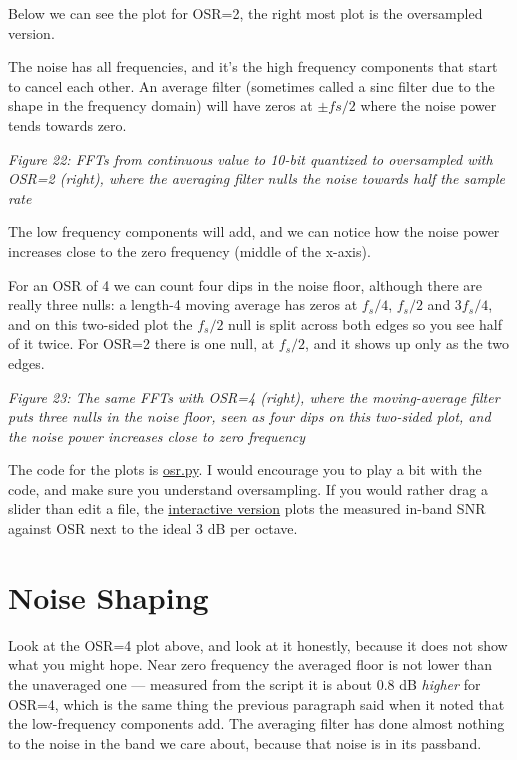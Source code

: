 Below we can see the plot for OSR=2, the right most plot is the
oversampled version.

The noise has all frequencies, and it's the high frequency components
that start to cancel each other. An average filter (sometimes called a
sinc filter due to the shape in the frequency domain) will have zeros at
\(\pm fs/2\) where the noise power tends towards zero.


{
\centering
{}
}

\emph{Figure 22: FFTs from continuous value to 10-bit quantized to
oversampled with OSR=2 (right), where the averaging filter nulls the
noise towards half the sample rate}

The low frequency components will add, and we can notice how the noise
power increases close to the zero frequency (middle of the x-axis).

For an OSR of 4 we can count four dips in the noise floor, although
there are really three nulls: a length-4 moving average has zeros at
\(f_s/4\), \(f_s/2\) and \(3f_s/4\), and on this two-sided plot the
\(f_s/2\) null is split across both edges so you see half of it twice.
For OSR=2 there is one null, at \(f_s/2\), and it shows up only as the
two edges.


{
\centering
{}
}

\emph{Figure 23: The same FFTs with OSR=4 (right), where the
moving-average filter puts three nulls in the noise floor, seen as four
dips on this two-sided plot, and the noise power increases close to zero
frequency}

The code for the plots is
\href{https://github.com/wulffern/aic2026/blob/main/ex/osr.py}{osr.py}.
I would encourage you to play a bit with the code, and make sure you
understand oversampling. If you would rather drag a slider than edit a
file, the
\href{https://wulffern.github.io/aic2026/assets/examples/oversampling.html}{interactive
version} plots the measured in-band SNR against OSR next to the ideal 3
dB per octave.

\section{Noise Shaping}\label{noise-shaping}

Look at the OSR=4 plot above, and look at it honestly, because it does
not show what you might hope. Near zero frequency the averaged floor is
not lower than the unaveraged one --- measured from the script it is
about 0.8 dB \emph{higher} for OSR=4, which is the same thing the
previous paragraph said when it noted that the low-frequency components
add. The averaging filter has done almost nothing to the noise in the
band we care about, because that noise is in its passband.

